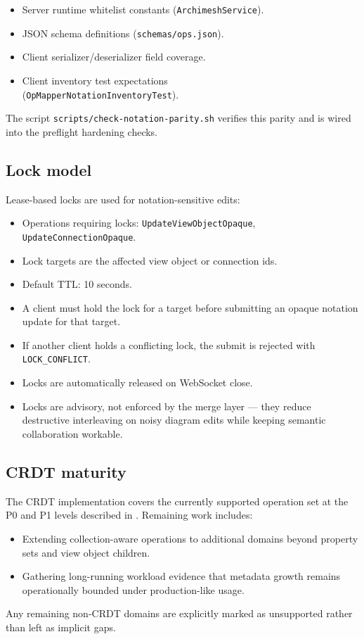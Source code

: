 \begin{itemize}
\item Server runtime whitelist constants (\texttt{ArchimeshService}).
\item JSON schema definitions (\texttt{schemas/ops.json}).
\item Client serializer/deserializer field coverage.
\item Client inventory test expectations \\
  (\texttt{OpMapperNotationInventoryTest}).
\end{itemize}

The script \texttt{scripts/check-notation-parity.sh} verifies this parity
and is wired into the preflight hardening checks.

\subsection{Lock model}

Lease-based locks are used for notation-sensitive edits:

\begin{itemize}
\item Operations requiring locks: \texttt{UpdateViewObjectOpaque},
  \texttt{UpdateConnectionOpaque}.
\item Lock targets are the affected view object or connection ids.
\item Default TTL: 10 seconds.
\item A client must hold the lock for a target before submitting an opaque
  notation update for that target.
\item If another client holds a conflicting lock, the submit is rejected
  with \texttt{LOCK\_CONFLICT}.
\item Locks are automatically released on WebSocket close.
\item Locks are advisory, not enforced by the merge layer --- they reduce
  destructive interleaving on noisy diagram edits while keeping semantic
  collaboration workable.
\end{itemize}

\subsection{CRDT maturity}

The CRDT implementation covers the currently supported operation set at the
P0 and P1 levels described in . Remaining work
includes:

\begin{itemize}
\item Extending collection-aware operations to additional domains beyond
  property sets and view object children.
\item Gathering long-running workload evidence that metadata growth remains
  operationally bounded under production-like usage.
\end{itemize}

Any remaining non-CRDT domains are explicitly marked as unsupported rather
than left as implicit gaps.
